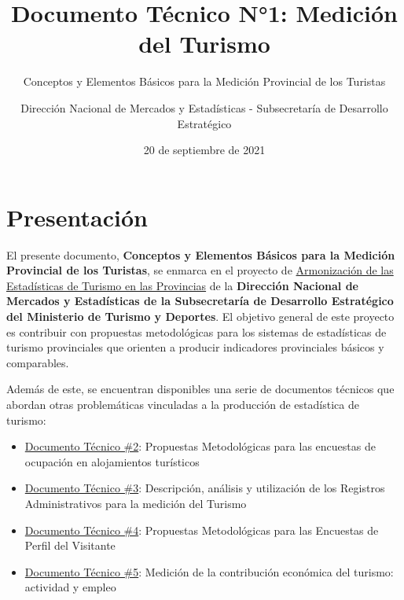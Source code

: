 \documentclass[
  openany]{book}
\title{Documento Técnico N°1: Medición del Turismo}
\subtitle{Conceptos y Elementos Básicos para la Medición Provincial de los Turistas}
\author{Dirección Nacional de Mercados y Estadísticas - Subsecretaría de Desarrollo Estratégico}
\date{20 de septiembre de 2021}
\let\oldmaketitle\maketitle
\begin{document}
\maketitle


\newpage

\let\maketitle\oldmaketitle
\maketitle

{
\setcounter{tocdepth}{1}
\tableofcontents
}
\hypertarget{presentaciuxf3n}{%
\chapter*{Presentación}\label{presentaciuxf3n}}

El presente documento, \textbf{Conceptos y Elementos Básicos para la Medición Provincial de los Turistas}, se enmarca en el proyecto de \href{https://armonizacion.yvera.tur.ar//}{Armonización de las Estadísticas de Turismo en las Provincias} de la \textbf{Dirección Nacional de Mercados y Estadísticas de la Subsecretaría de Desarrollo Estratégico del Ministerio de Turismo y Deportes}. El objetivo general de este proyecto es contribuir con propuestas metodológicas para los sistemas de estadísticas de turismo provinciales que orienten a producir indicadores provinciales básicos y comparables.

Además de este, se encuentran disponibles una serie de documentos técnicos que abordan otras problemáticas vinculadas a la producción de estadística de turismo:

\begin{itemize}
\item
  \href{https://dnme-minturdep.github.io/DT2_encuestas/}{Documento Técnico \#2}: Propuestas Metodológicas para las encuestas de ocupación en alojamientos turísticos
\item
  \href{https://dnme-minturdep.github.io/DT3_registros_adminsitrativos/}{Documento Técnico \#3}: Descripción, análisis y utilización de los Registros Administrativos para la medición del Turismo
\item
  \href{https://dnme-minturdep.github.io/DT4_perfiles/}{Documento Técnico \#4}: Propuestas Metodológicas para las Encuestas de Perfil del Visitante
\item
  \href{https://dnme-minturdep.github.io/DT5_actividad_empleo/}{Documento Técnico \#5}: Medición de la contribución económica del turismo: actividad y empleo
\end{itemize}
\end{document}
